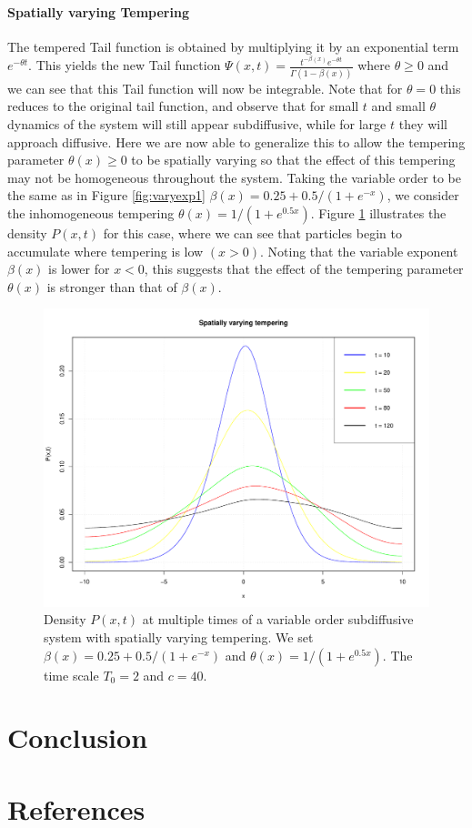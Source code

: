 \documentclass[a4paper,12pt]{elsarticle}
\numberwithin{equation}{section}
\theoremstyle{plain}
\theoremstyle{definition}
\theoremstyle{remark}
\numberwithin{equation}{section}
\newcommand{\1}{\mathbf 1}
\begin{document}
\paragraph{Spatially varying Tempering}  The tempered Tail function is obtained by multiplying it by an exponential term $e^{-\theta  t}$. This yields the new Tail function $\Psi(x,t) = \frac{t^{-\beta(x)} e^{-\theta  t}}{\Gamma (1-\beta(x))}$ where $\theta \geq 0$ and we can see that this Tail function will now be integrable. Note that for $\theta = 0$ this reduces to the original tail function, and observe that for small $t$ and small $\theta$ dynamics of the system will still appear subdiffusive, while for large $t$ they will approach diffusive. Here we are now able to generalize this to allow the tempering parameter $\theta (x) \geq 0$ to be spatially varying so that the effect of this tempering may not be homogeneous throughout the system. Taking the variable order to be the same as in Figure \ref{fig:varyexp1} $\beta(x) = 0.25 + 0.5/(1+e^{-x})$, we consider the inhomogeneous tempering $\theta (x) = 1/(1+e^{0.5x})$. Figure \ref{fig:varytempering} illustrates the density $P(x,t)$ for this case, where we can see that particles begin to accumulate where tempering is low $(x>0)$. Noting that the variable exponent $\beta(x)$ is lower for $x<0$, this suggests that the effect of the tempering parameter $\theta (x)$ is stronger than that of $\beta(x)$. \\

\begin{figure}[h]
\includegraphics[scale=0.6]{varytempering}
\caption{\label{fig:varytempering}
Density $P(x,t)$ at multiple times of a variable order subdiffusive system with spatially varying tempering. We set $\beta(x) = 0.25 + 0.5/(1+e^{-x})$ and $\theta (x) = 1/(1+e^{0.5x})$. The time scale $T_0 = 2$ and $c = 40$.}
\end{figure}



\section{Conclusion}

\section*{References}


\end{document}
